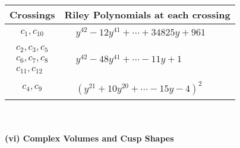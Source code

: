 \documentclass[1p]{elsarticle_modified}
\theoremstyle{definition}
\begin{document}
\begin{tabular}{m{50pt}|m{274pt}}
Crossings & \hspace{64pt}Riley Polynomials at each crossing \\
\hline $$\begin{aligned}c_{1},c_{10}\end{aligned}$$&$\begin{aligned}
&y^{42}-12 y^{41}+\cdots+34825 y+961
\end{aligned}$\\
\hline $$\begin{aligned}c_{2},c_{3},c_{5}\\c_{6},c_{7},c_{8}\\c_{11},c_{12}\end{aligned}$$&$\begin{aligned}
&y^{42}-48 y^{41}+\cdots-11 y+1
\end{aligned}$\\
\hline $$\begin{aligned}c_{4},c_{9}\end{aligned}$$&$\begin{aligned}
&(y^{21}+10 y^{20}+\cdots-15 y-4)^{2}
\end{aligned}$\\
\hline
\end{tabular}\\~\\
\newpage\flushleft \textbf{(vi) Complex Volumes and Cusp Shapes}
\end{document}
